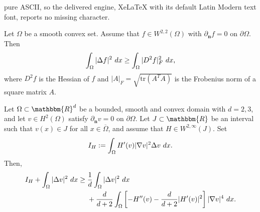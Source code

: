 \documentclass[10pt,a4paper]{amsart}
\newcommand{\dx}{\textup{d}x}
\begin{document}
pure ASCII, so the delivered engine, XeLaTeX with its default Latin Modern text font, reports no missing character.
\begin{lemma}
\label{lemma H2}
    Let $\Omega$ be a smooth convex set. Assume that
    $f \in W^{2,2}(\Omega)$ with $\partial_{\mathbf{n}} f=0$ on $\partial \Omega$. Then
    $$
    \int_\Omega |\Delta f|^2 \ \dx \ge \int_\Omega |D^2 f |_F^2 \ \dx,
    $$
where $D^2 f$ is the Hessian of $f$ and $|A|_F= \sqrt{\textrm{tr}(A^TA)}$ is the Frobenius norm of a square matrix $A$. 
\end{lemma}

\begin{lemma}
\label{refined-lemma}
Let $\Omega\subset\mathbbm{R}^d$ be a bounded, smooth and convex domain with $d=2,3$, and let $v\in H^2(\Omega)$ satisfy $\partial_\mathbf{n} v=0$ on $\partial \Omega$.
Let $J\subset\mathbbm{R}$ be an interval such that $v(x)\in J$ for all
$x\in\overline{\Omega}$, and assume that $H\in W^{2,\infty}(J)$. Set
\[
    I_H
    :=
    \int_\Omega H'(v)|\nabla v|^2\Delta v \ \dx.
\]
Then,
\begin{align}
    I_H+\int_\Omega|\Delta v|^2\ \dx
    \geq{}&
    \frac1d\int_\Omega|\Delta v|^2\ \dx
    \nonumber\\
    &+
    \frac{d}{d+2}
    \int_\Omega
    \left[
        -H''(v)
        -
        \frac{d}{d+2}|H'(v)|^2
    \right]
    |\nabla v|^4\ \dx.
\label{eq:refined-lemma}
\end{align}
\end{lemma}
\end{document}
